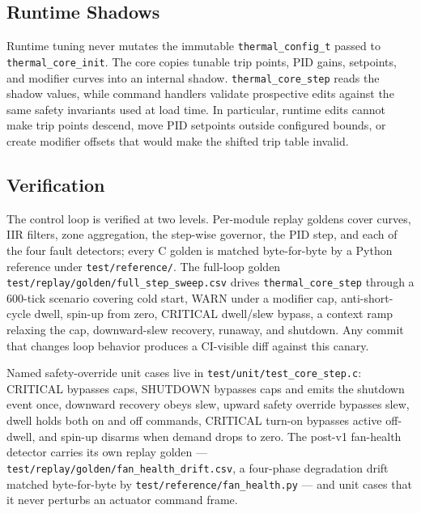 \subsection{Runtime Shadows}

Runtime tuning never mutates the immutable \texttt{thermal\_config\_t} passed to \texttt{thermal\_core\_init}. The core copies tunable trip points, PID gains, setpoints, and modifier curves into an internal shadow. \texttt{thermal\_core\_step} reads the shadow values, while command handlers validate prospective edits against the same safety invariants used at load time. In particular, runtime edits cannot make trip points descend, move PID setpoints outside configured bounds, or create modifier offsets that would make the shifted trip table invalid.

\subsection{Verification}

The control loop is verified at two levels. Per-module replay goldens cover curves, IIR filters, zone aggregation, the step-wise governor, the PID step, and each of the four fault detectors; every C golden is matched byte-for-byte by a Python reference under \texttt{test/reference/}. The full-loop golden \texttt{test/replay/golden/full\_step\_sweep.csv} drives \texttt{thermal\_core\_step} through a 600-tick scenario covering cold start, WARN under a modifier cap, anti-short-cycle dwell, spin-up from zero, CRITICAL dwell/slew bypass, a context ramp relaxing the cap, downward-slew recovery, runaway, and shutdown. Any commit that changes loop behavior produces a CI-visible diff against this canary.

Named safety-override unit cases live in \texttt{test/unit/test\_core\_step.c}: CRITICAL bypasses caps, SHUTDOWN bypasses caps and emits the shutdown event once, downward recovery obeys slew, upward safety override bypasses slew, dwell holds both on and off commands, CRITICAL turn-on bypasses active off-dwell, and spin-up disarms when demand drops to zero. The post-v1 fan-health detector carries its own replay golden --- \texttt{test/replay/golden/fan\_health\_drift.csv}, a four-phase degradation drift matched byte-for-byte by \texttt{test/reference/fan\_health.py} --- and unit cases that it never perturbs an actuator command frame.

\endinput
